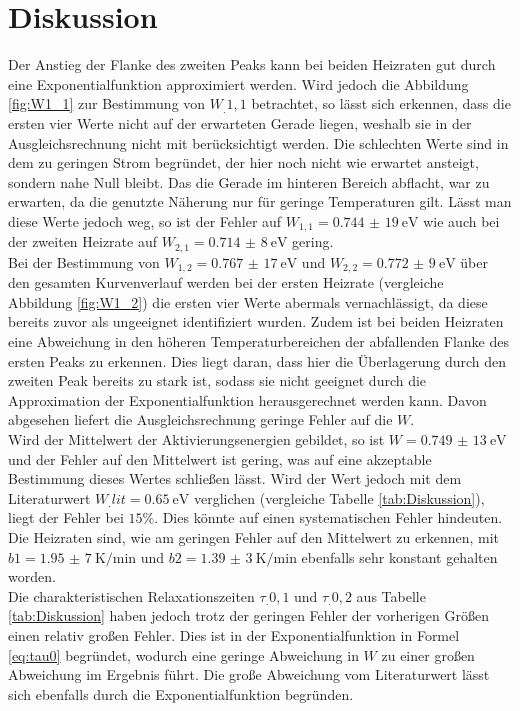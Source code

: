 
\section{Diskussion}
\label{sec:Diskussion}

Der Anstieg der Flanke des zweiten Peaks kann bei beiden Heizraten gut durch eine Exponentialfunktion approximiert werden. Wird jedoch die Abbildung \ref{fig:W1_1} zur Bestimmung von $W_.{1,1}$ betrachtet, so lässt sich erkennen, dass die ersten vier Werte nicht auf der erwarteten Gerade liegen, weshalb sie in der Ausgleichsrechnung nicht mit berücksichtigt werden. Die schlechten Werte sind in dem zu geringen Strom begründet, der hier noch nicht wie erwartet ansteigt, sondern nahe Null bleibt. Das die Gerade im hinteren Bereich abflacht, war zu erwarten, da die genutzte Näherung nur für geringe Temperaturen gilt. Lässt man diese Werte jedoch weg, so ist der Fehler auf $W_{1,1}=\SI{0,744(19)}{\electronvolt}$ wie auch bei der zweiten Heizrate auf $W_{2,1}=\SI{0,714(8)}{\electronvolt}$ gering.\\
Bei der Bestimmung von $W_{1,2}=\SI{0,767(17)}{\electronvolt}$ und $W_{2,2}=\SI{0,772(9)}{\electronvolt}$ über den gesamten Kurvenverlauf werden bei der ersten Heizrate (vergleiche Abbildung \ref{fig:W1_2}) die ersten vier Werte abermals vernachlässigt, da diese bereits zuvor als ungeeignet identifiziert wurden. Zudem ist bei beiden Heizraten eine Abweichung in den höheren Temperaturbereichen der abfallenden Flanke des ersten Peaks zu erkennen. Dies liegt daran, dass hier die Überlagerung durch den zweiten Peak bereits zu stark ist, sodass sie nicht geeignet durch die Approximation der Exponentialfunktion herausgerechnet werden kann. Davon abgesehen liefert die Ausgleichsrechnung geringe Fehler auf die $W$.\\
Wird der Mittelwert der Aktivierungsenergien gebildet, so ist $W=\SI{0,749(13)}{\electronvolt}$ und der Fehler auf den Mittelwert ist gering, was auf eine akzeptable Bestimmung dieses Wertes schließen lässt. Wird der Wert jedoch mit dem Literaturwert $W_.{lit}=\SI{0,65}{\eV}$ \cite{DipolW} verglichen (vergleiche Tabelle \ref{tab:Diskussion}), liegt der Fehler bei $15\%$. Dies könnte auf einen systematischen Fehler hindeuten. Die Heizraten sind, wie am geringen Fehler auf den Mittelwert zu erkennen, mit $b1=\SI{1,95(7)}{\kelvin\per\minute}$ und $b2=\SI{1,39(3)}{\kelvin\per\minute}$ ebenfalls sehr konstant gehalten worden.\\
Die charakteristischen Relaxationszeiten $\tau_.{0,1}$ und $\tau_.{0,2}$ aus Tabelle \ref{tab:Diskussion} haben jedoch trotz der geringen Fehler der vorherigen Größen einen relativ großen Fehler. Dies ist in der Exponentialfunktion in Formel \eqref{eq:tau0} begründet, wodurch eine geringe Abweichung in $W$ zu einer großen Abweichung im Ergebnis führt. Die große Abweichung vom Literaturwert lässt sich ebenfalls durch die Exponentialfunktion begründen.
